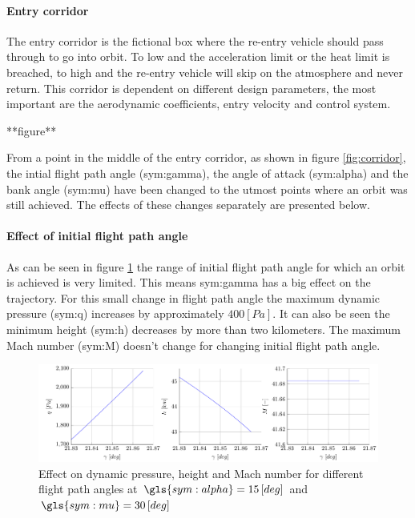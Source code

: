 \paragraph{Entry corridor}

The entry corridor is the fictional box where the re-entry vehicle should pass through to go into orbit. To low and the acceleration limit or the heat limit is breached, to high and the re-entry vehicle will skip on the atmosphere and never return. This corridor is dependent on different design parameters, the most important are the aerodynamic coefficients, entry velocity and control system.

**figure**

From a point in the middle of the entry corridor, as shown in figure \ref{fig:corridor}, the intial flight path angle (\gls{sym:gamma}), the angle of attack (\gls{sym:alpha}) and the bank angle (\gls{sym:mu}) have been changed to the utmost points where an orbit was still achieved. The effects of these changes separately are presented below.

\paragraph{Effect of initial flight path angle}

As can be seen in figure \ref{fig:effectgamma} the range of initial flight path angle for which an orbit is achieved is very limited. This means \gls{sym:gamma} has a big effect on the trajectory. For this small change in flight path angle the maximum dynamic pressure (\gls{sym:q}) increases by approximately $400 \left[Pa\right]$. It can also be seen the minimum height (\gls{sym:h}) decreases by more than two kilometers. The maximum Mach number (\gls{sym:M}) doesn't change for changing initial flight path angle.

\begin{figure}[ht!]
	\centering
	\includegraphics[width=\textwidth]{./Figure/orbit/effectgamma.pdf}
	\caption{Effect on dynamic pressure, height and Mach number for different flight path angles at $\gls{sym:alpha}=15 \left[deg\right]$ and $\gls{sym:mu}=30 \left[deg\right]$}
	\label{fig:effectgamma}
\end{figure}

